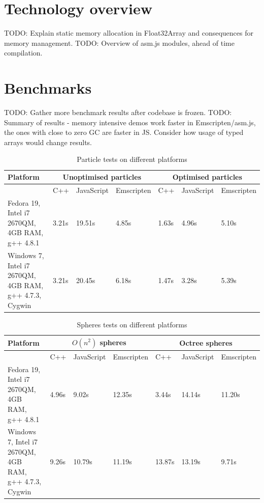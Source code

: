 \section{Technology overview}
\label{sec:emscriptenoverview}

TODO: Explain static memory allocation in Float32Array and consequences for memory management.
TODO: Overview of asm.js modules, ahead of time compilation.


\section{Benchmarks}
\label{sec:embenchmarks}

TODO: Gather more benchmark results after codebase is frozen.
TODO: Summary of results - memory intensive demos work faster in Emscripten/asm.js, the ones with close to zero GC are faster in JS. Consider how usage of typed arrays would change results.

\begin{table}[h!]
\caption{Particle tests on different platforms}
\label{table:benchmarks}
\begin{tabular}{|p{4cm}||l|l|l||l|l|l|}
  	\hline
   Platform & \multicolumn{3}{c}{Unoptimised particles} & \multicolumn{3}{c}{Optimised particles}\\ \hline
   & C++ & JavaScript & Emscripten & C++ & JavaScript & Emscripten\\ \hline
   Fedora 19, Intel i7 2670QM, 4GB RAM, g++ 4.8.1 & 3.21s & 19.51s & 4.85s & 1.63s & 4.96s & 5.10s \\ \hline
   Windows 7, Intel i7 2670QM, 4GB RAM, g++ 4.7.3, Cygwin & 3.21s & 20.45s & 6.18s & 1.47s & 3.28s & 5.39s \\ \hline
\end{tabular}
\end{table}

\begin{table}[h!]
\caption{Spheres tests on different platforms}
\label{table:benchmarks}
\begin{tabular}{|p{4cm}||l|l|l||l|l|l|}
   \hline
   Platform & \multicolumn{3}{c}{$O(n^2)$ spheres} & \multicolumn{3}{c}{Octree spheres}\\ \hline
   & C++ & JavaScript & Emscripten & C++ & JavaScript & Emscripten\\ \hline
   Fedora 19, Intel i7 2670QM, 4GB RAM, g++ 4.8.1 & 4.96s & 9.02s & 12.35s & 
3.44s & 14.14s & 11.20s \\ \hline
   Windows 7, Intel i7 2670QM, 4GB RAM, g++ 4.7.3, Cygwin & 9.26s & 10.79s & 11.19s & 13.87s & 13.19s & 9.71s \\\hline
\end{tabular}
\end{table}
